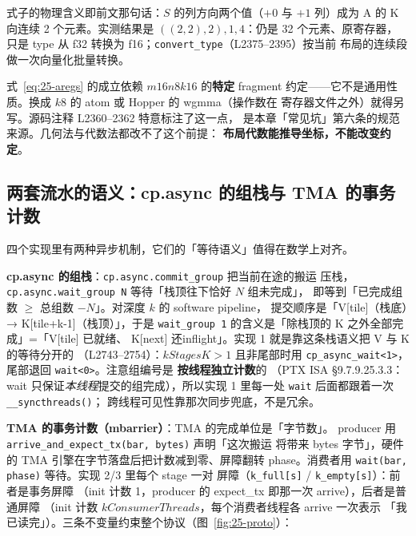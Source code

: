 式子的物理含义即前文那句话：$S$ 的列方向两个值（$+0$ 与 $+1$ 列）成为 A 的
K 向连续 2 个元素。实测结果是 $((2,2),2),1,4$：仍是 32 个元素、原寄存器，
只是 type 从 f32 转换为 f16；\texttt{convert\_\allowbreak{}type}（L2375--2395）按当前
布局的连续段做一次向量化批量转换。

\begin{remark}
  式~\eqref{eq:25-aregs} 的成立依赖 $m16n8k16$ 的\textbf{特定} fragment
  约定——它不是通用性质。换成 $k8$ 的 atom 或 Hopper 的 wgmma（操作数在
  寄存器文件之外）就得另写。源码注释 L2360--2362 特意标注了这一点，
  是本章「常见坑」第六条的规范来源。几何法与代数法都改不了这个前提：
  \textbf{布局代数能推导坐标，不能改变约定}。
\end{remark}

\subsection{两套流水的语义：cp.async 的组栈与 TMA 的事务计数}

四个实现里有两种异步机制，它们的「等待语义」值得在数学上对齐。

\textbf{cp.async 的组栈}：\texttt{cp.\allowbreak{}async.\allowbreak{}commit\_\allowbreak{}group} 把当前在途的搬运
压栈，\texttt{cp.\allowbreak{}async.\allowbreak{}wait\_\allowbreak{}group N} 等待「栈顶往下恰好 $N$ 组未完成」，
即等到「已完成组数 $\ge$ 总组数 $-N$」。对深度 $k$ 的 software pipeline，
提交顺序是「V[tile]（栈底）→ K[tile+k-1]（栈顶）」，于是
\texttt{wait\_group 1} 的含义是「除栈顶的 K 之外全部完成」=「V[tile] 已就绪、
K[next] 还inflight」。实现 1 就是靠这条栈语义把 V 与 K 的等待分开的
（L2743--2754）：$kStagesK>1$ 且非尾部时用 \texttt{cp\_\allowbreak{}async\_\allowbreak{}wait\allowbreak{}<1>}，
尾部退回 \texttt{wait<0>}。注意组编号是 \textbf{按线程独立计数}的
（PTX ISA §9.7.9.25.3.3：wait 只保证\emph{本线程}提交的组完成），所以实现 1
里每一处 \texttt{wait} 后面都跟着一次 \texttt{\_\allowbreak{}\_\allowbreak{}syncthreads\allowbreak{}()}；
跨线程可见性靠那次同步兜底，不是冗余。

\textbf{TMA 的事务计数（mbarrier）}：TMA 的完成单位是「字节数」。
producer 用 \texttt{arrive\_\allowbreak{}and\_\allowbreak{}expect\_\allowbreak{}tx(bar, bytes)} 声明「这次搬运
将带来 bytes 字节」，硬件的 TMA 引擎在字节落盘后把计数减到零、屏障翻转
phase。消费者用 \texttt{wait(bar, phase)} 等待。实现 2/3 里每个 stage 一对
屏障（\texttt{k\_full[s]} / \texttt{k\_empty[s]}）：前者是事务屏障
（init 计数 1，producer 的 expect\_tx 即那一次 arrive），后者是普通屏障
（init 计数 $kConsumerThreads$，每个消费者线程各 arrive 一次表示
「我已读完」）。三条不变量约束整个协议（图~\ref{fig:25-proto}）：

